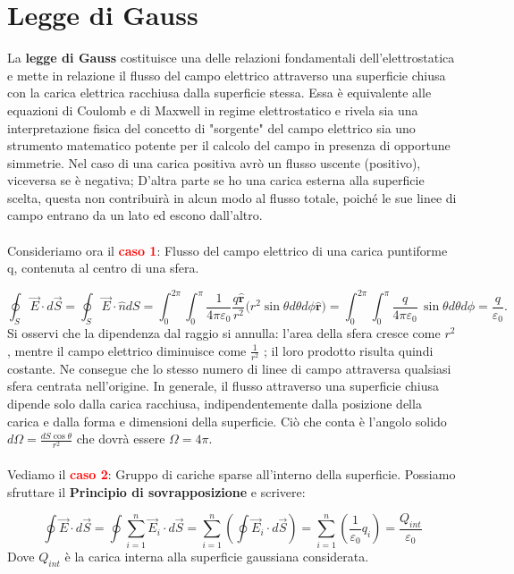 \documentclass{book}
\begin{document}
\section{Legge di Gauss}
La \textbf{legge di Gauss} costituisce una delle relazioni fondamentali dell'elettrostatica e mette in relazione il flusso del campo elettrico attraverso una superficie chiusa con la carica elettrica racchiusa dalla superficie stessa. Essa è equivalente alle equazioni di Coulomb e di Maxwell in regime elettrostatico e rivela sia una interpretazione fisica del concetto di "sorgente" del campo elettrico sia uno strumento matematico potente per il calcolo del campo in presenza di opportune simmetrie.
Nel caso di una carica positiva avrò un flusso uscente (positivo), viceversa se è negativa; D'altra parte se ho una carica esterna alla superficie scelta, questa non contribuirà in alcun modo al flusso totale, poiché le sue linee di campo entrano da un lato ed escono dall'altro.
\\
\\
Consideriamo ora il \textbf{\textcolor{red}{caso 1}}: Flusso del campo elettrico di una carica puntiforme q, contenuta al centro di una sfera.

$$
\oint_{S}\vec{E}\cdot d\vec{S}
=\oint_{S}\vec{E}\cdot \hat{n}d{S}
=
\int_{0}^{2\pi} \int_{0}^{\pi}
\frac{1}{4\pi\varepsilon_0}\frac{q \hat{\mathbf r}}{r^{2}}
\bigl(r^{2}\sin\theta d\theta d\phi \hat{\mathbf r}\bigr)
=\int_{0}^{2\pi} \int_{0}^{\pi}\frac{q}{4\pi\varepsilon_0}\,\sin\theta d\theta d\phi= \frac{q}{\varepsilon_0}.
$$
Si osservi che la dipendenza dal raggio si annulla: l’area della sfera cresce come  $r^{2} $, mentre il campo elettrico diminuisce come $\frac{1}{r^{2}}$ ; il loro prodotto risulta quindi costante. Ne consegue che lo stesso numero di linee di campo attraversa qualsiasi sfera centrata nell’origine. In generale, il flusso attraverso una superficie chiusa dipende solo dalla carica racchiusa, indipendentemente dalla posizione della carica  e dalla forma e dimensioni della superficie.
Ciò che conta è l’angolo solido $d\Omega = \frac{dS\cos\theta}{r^{2}}$ che dovrà essere $\Omega=4\pi$. 
\\
\\
Vediamo il \textbf{\textcolor{red}{caso 2}}: Gruppo di cariche sparse all'interno della superficie.
Possiamo sfruttare il \textbf{Principio di sovrapposizione} e scrivere:

\[
\oint \vec{E} \cdot d\vec{S}
=  \oint \sum_{i=1}^{n}\vec{E}_i \cdot d\vec{S} 
= \sum_{i=1}^{n} \left( \oint \vec{E}_i \cdot d\vec{S} \right)
= \sum_{i=1}^{n} \left( \frac{1}{\varepsilon_0} q_i \right)=  \frac{Q_{int}}{\varepsilon_0}  
\]
Dove $Q_{int}$ è la carica interna alla superficie gaussiana considerata. 
\end{document}
